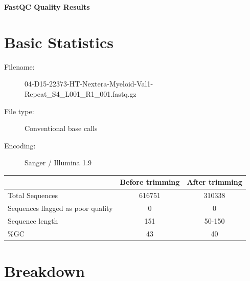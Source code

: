 \documentclass{article}
\begin{document}
\makeatletter
\setlength{\@fptop}{0pt}
\makeatother
\renewcommand{\baselinestretch}{1.0}
\begin{center}
\Large{\textbf{FastQC Quality Results}}
\end{center}
\section{Basic Statistics}
\begin{description}
\item[Filename:]
04{-}D15{-}22373{-}HT{-}Nextera{-}Myeloid{-}Val1{-}Repeat\_S4\_L001\_R1\_001.fastq.gz
\item[File type:]
Conventional base calls
\item[Encoding:]
Sanger / Illumina 1.9
\end{description}
\begin{tabular}{p{5.5cm}|c|c}
&Before trimming&After trimming\\
\hline
Total Sequences&616751&310338\\
Sequences flagged as poor quality&0&0\\
Sequence length&151&50{-}150\\
\%GC&43&40\\
\end{tabular}


\section{Breakdown}
\end{document}
